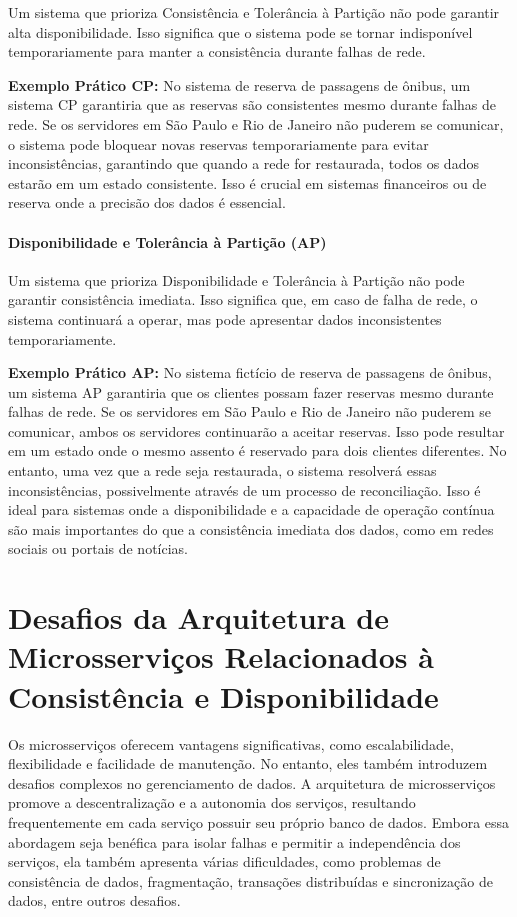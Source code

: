 Um sistema que prioriza Consistência e Tolerância à Partição não pode garantir alta disponibilidade. Isso significa que o sistema pode se tornar indisponível temporariamente para manter a consistência durante falhas de rede.

\textbf{Exemplo Prático CP:} No sistema de reserva de passagens de ônibus, um sistema CP garantiria que as reservas são consistentes mesmo durante falhas de rede. Se os servidores em São Paulo e Rio de Janeiro não puderem se comunicar, o sistema pode bloquear novas reservas temporariamente para evitar inconsistências, garantindo que quando a rede for restaurada, todos os dados estarão em um estado consistente. Isso é crucial em sistemas financeiros ou de reserva onde a precisão dos dados é essencial.

\subsubsection{Disponibilidade e Tolerância à Partição (AP)}

Um sistema que prioriza Disponibilidade e Tolerância à Partição não pode garantir consistência imediata. Isso significa que, em caso de falha de rede, o sistema continuará a operar, mas pode apresentar dados inconsistentes temporariamente.

\textbf{Exemplo Prático AP:} No sistema fictício de reserva de passagens de ônibus, um sistema AP garantiria que os clientes possam fazer reservas mesmo durante falhas de rede. Se os servidores em São Paulo e Rio de Janeiro não puderem se comunicar, ambos os servidores continuarão a aceitar reservas. Isso pode resultar em um estado onde o mesmo assento é reservado para dois clientes diferentes. No entanto, uma vez que a rede seja restaurada, o sistema resolverá essas inconsistências, possivelmente através de um processo de reconciliação. Isso é ideal para sistemas onde a disponibilidade e a capacidade de operação contínua são mais importantes do que a consistência imediata dos dados, como em redes sociais ou portais de notícias.



\chapter{Desafios da Arquitetura de Microsserviços Relacionados à Consistência e Disponibilidade}

Os microsserviços oferecem vantagens significativas, como escalabilidade, flexibilidade e facilidade de manutenção. No entanto, eles também introduzem desafios complexos no gerenciamento de dados. A arquitetura de microsserviços promove a descentralização e a autonomia dos serviços, resultando frequentemente em cada serviço possuir seu próprio banco de dados. Embora essa abordagem seja benéfica para isolar falhas e permitir a independência dos serviços, ela também apresenta várias dificuldades, como problemas de consistência de dados, fragmentação, transações distribuídas e sincronização de dados, entre outros desafios.


